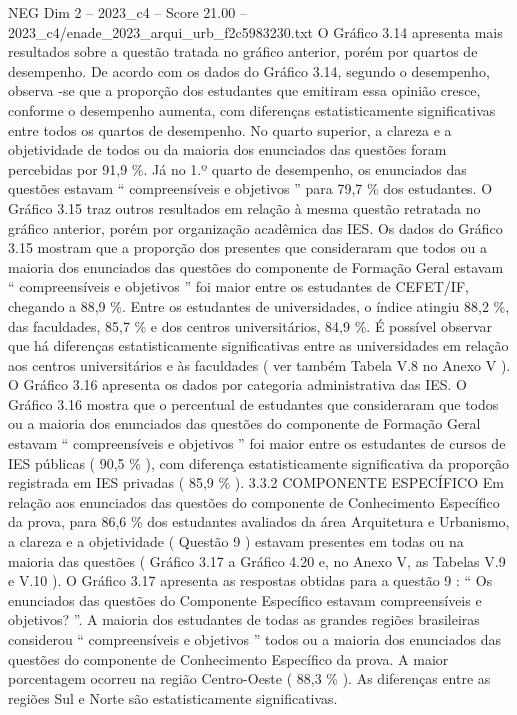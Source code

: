 \begin{textsample}{NEG Dim 2 – 2023\_c4 – Score 21.00 – 2023\_c4/enade\_2023\_arqui\_urb\_f2c5983230.txt}
O Gráfico 3.14 apresenta mais resultados sobre a questão tratada no gráfico anterior, porém por quartos de desempenho.
De acordo com os dados do Gráfico 3.14, segundo o desempenho, observa -se que a proporção dos estudantes que emitiram essa opinião cresce, conforme o desempenho aumenta, com diferenças estatisticamente significativas entre todos os quartos de desempenho.
No quarto superior, a clareza e a objetividade de todos ou da maioria dos enunciados das questões foram percebidas por 91,9 \%.
Já no 1.º quarto de desempenho, os enunciados das questões estavam “ compreensíveis e objetivos ” para 79,7 \% dos estudantes.
O Gráfico 3.15 traz outros resultados em relação à mesma questão retratada no gráfico anterior, porém por organização acadêmica das IES.
Os dados do Gráfico 3.15 mostram que a proporção dos presentes que consideraram que todos ou a maioria dos enunciados das questões do componente de Formação Geral estavam “ compreensíveis e objetivos ” foi maior entre os estudantes de CEFET/IF, chegando a 88,9 \%.
Entre os estudantes de universidades, o índice atingiu 88,2 \%, das faculdades, 85,7 \% e dos centros universitários, 84,9 \%.
É possível observar que há diferenças estatisticamente significativas entre as universidades em relação aos centros universitários e às faculdades ( ver também Tabela V.8 no Anexo V ).
O Gráfico 3.16 apresenta os dados por categoria administrativa das IES.
O Gráfico 3.16 mostra que o percentual de estudantes que consideraram que todos ou a maioria dos enunciados das questões do componente de Formação Geral estavam “ compreensíveis e objetivos ” foi maior entre os estudantes de cursos de IES públicas ( 90,5 \% ), com diferença estatisticamente significativa da proporção registrada em IES privadas ( 85,9 \% ). 3.3.2 COMPONENTE ESPECÍFICO Em relação aos enunciados das questões do componente de Conhecimento Específico da prova, para 86,6 \% dos estudantes avaliados da área Arquitetura e Urbanismo, a clareza e a objetividade ( Questão 9 ) estavam presentes em todas ou na maioria das questões ( Gráfico 3.17 a Gráfico 4.20 e, no Anexo V, as Tabelas V.9 e V.10 ).
O Gráfico 3.17 apresenta as respostas obtidas para a questão 9 : “ Os enunciados das questões do Componente Específico estavam compreensíveis e objetivos? ”.
A maioria dos estudantes de todas as grandes regiões brasileiras considerou “ compreensíveis e objetivos ” todos ou a maioria dos enunciados das questões do componente de Conhecimento Específico da prova.
A maior porcentagem ocorreu na região Centro-Oeste ( 88,3 \% ).
As diferenças entre as regiões Sul e Norte são estatisticamente significativas.

\end{textsample}

